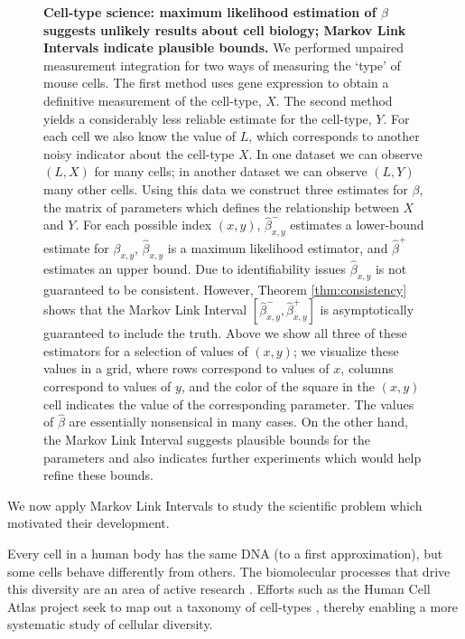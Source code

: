 \documentclass{article}
\theoremstyle{definition}
\begin{document}
\begin{figure}
{\begin{minipage}{\textwidth}
\hfill{}\begin{minipage}{.9\textwidth}
\caption{\textbf{Cell-type science: maximum likelihood estimation of $\beta$ suggests unlikely results about cell biology; Markov Link Intervals indicate plausible bounds.}  \label{fig:allen}
%
We performed unpaired measurement integration for two ways of measuring the `type' of mouse cells.  The first method uses gene expression to obtain a definitive measurement of the cell-type, $X$.  The second method yields a considerably less reliable estimate for the cell-type, $Y$.  For each cell we also know the value of $L$, which corresponds to another noisy indicator about the cell-type $X$.  In one dataset we can observe $(L,X)$ for many cells; in another dataset we can observe $(L,Y)$ many other cells.  Using this data we construct three estimates for $\beta$, the matrix of parameters which defines the relationship between $X$ and $Y$.  For each possible index $(x,y)$, $\hat \beta^{-}_{x,y}$ estimates a lower-bound estimate for $\beta_{x,y}$, $\hat \beta_{x,y}$ is a maximum likelihood estimator, and $\hat \beta^{+}$ estimates an upper bound.  Due to identifiability issues $\hat \beta_{x,y}$ is not guaranteed to be consistent.  However, Theorem \ref{thm:consistency} shows that the Markov Link Interval $[\hat \beta^{-}_{x,y},\hat \beta^{+}_{x,y}]$ is asymptotically guaranteed to include the truth.  Above we show all three of these estimators for a selection of values of $(x,y)$; we visualize these values in a grid, where rows correspond to values of $x$, columns correspond to values of $y$, and the color of the square in the $(x,y)$ cell indicates the value of the corresponding parameter.  The values of $\hat \beta$ are essentially nonsensical in many cases.  On the other hand, the Markov Link Interval suggests plausible bounds for the parameters and also indicates further experiments which would help refine these bounds.
}
\end{minipage}\hfill{}
\end{minipage}}\end{figure}

We now apply Markov Link Intervals to study the scientific problem which motivated their development.  

Every cell in a human body has the same DNA (to a first approximation), but some cells behave differently from others.  The biomolecular processes that drive this diversity are an area of active research \cite{wagner2018single,boudreau2018cell,he2018mechanical}.  Efforts such as the Human Cell Atlas project seek to map out a taxonomy of cell-types \cite{rozenblatt2017human}, thereby enabling a more systematic study of cellular diversity.  
\end{document}
